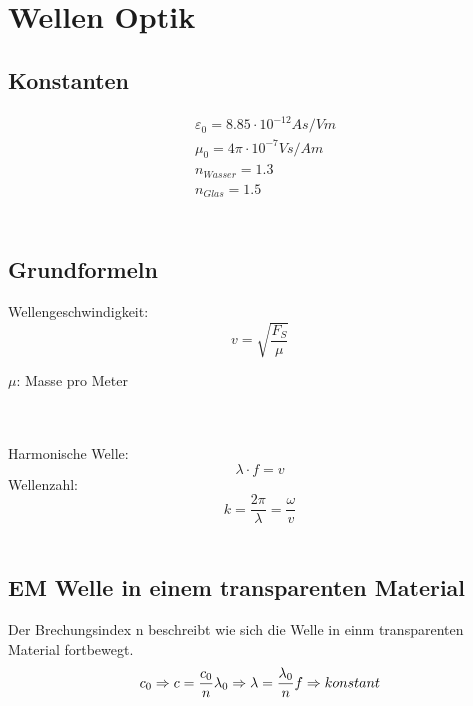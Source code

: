 



\chapter{Wellen Optik}
\section{Konstanten}
\[
\boxed{\begin{aligned}	
		&\varepsilon_0 = 8.85\cdot 10^{-12} As/Vm\\
		&\mu_0 = 4\pi \cdot 10^{-7} Vs/Am\\
		&n_{Wasser} = 1.3 \\
		&n_{Glas} = 1.5 \\
	\end{aligned}}	\]
\\
\section{Grundformeln}
Wellengeschwindigkeit:
\[
	v=\sqrt{\frac{F_S}{\mu}}
\]
\begin{footnotesize}
	$\mu$:	Masse pro Meter
\end{footnotesize}
\\
\\
Harmonische Welle:
\[
	\lambda \cdot f = v
\]
Wellenzahl:
\[
	k=\frac{2\pi}{\lambda}=\frac{\omega}{v}
\]
\\
\section{EM Welle in einem transparenten Material}
Der Brechungsindex n beschreibt wie sich die Welle in einm transparenten Material fortbewegt.
\[
	c_0 \Rightarrow c=  \frac{c_0}{n} \\
	\lambda_0 \Rightarrow \lambda=  \frac{\lambda_0}{n} \\
	f \Rightarrow  konstant\\
\]
\\
